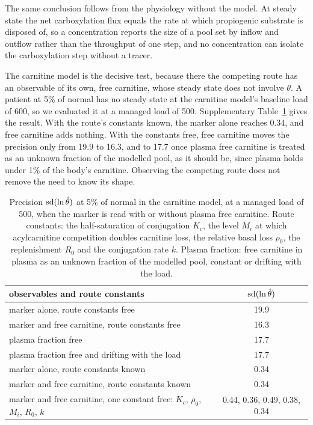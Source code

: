 The same conclusion follows from the physiology without the model. At steady state the net
carboxylation flux equals the rate at which propiogenic substrate is disposed of, so a
concentration reports the size of a pool set by inflow and outflow rather than the throughput
of one step, and no concentration can isolate the carboxylation step without a tracer.

The carnitine model is the decisive test, because there the competing route has an observable
of its own, free carnitine, whose steady state does not involve $\theta$. A patient at 5\% of
normal has no steady state at the carnitine model's baseline load of 600\um, so we evaluated it
at a managed load of 500\um. Supplementary Table~\ref{stab:s4carn} gives the result. With the
route's constants known, the marker alone reaches 0.34, and free carnitine adds nothing. With the
constants free, free carnitine moves the precision only from 19.9 to 16.3, and to 17.7 once plasma
free carnitine is treated as an unknown fraction of the modelled pool, as it should be, since
plasma holds under 1\% of the body's carnitine. Observing the competing route does not remove
the need to know its shape.

\begin{table}[htbp]
\centering\small
\caption{\label{stab:s4carn}Precision $\operatorname{sd}(\ln \hat\theta)$ at 5\% of normal in the carnitine model,
at a managed load of 500\um, when the marker is read with or without plasma free carnitine. Route
constants: the half-saturation of conjugation $K_c$, the level $M_i$ at which acylcarnitine
competition doubles carnitine loss, the relative basal loss $\rho_0$, the replenishment $R_0$
and the conjugation rate $k$. Plasma fraction: free carnitine in plasma as an unknown fraction
of the modelled pool, constant or drifting with the load.}
\begin{tabular}{@{}lc@{}}
\toprule
observables and route constants & $\operatorname{sd}(\ln \hat\theta)$ \\
\midrule
marker alone, route constants free & 19.9 \\
marker and free carnitine, route constants free & 16.3 \\
\quad plasma fraction free & 17.7 \\
\quad plasma fraction free and drifting with the load & 17.7 \\
marker alone, route constants known & 0.34 \\
marker and free carnitine, route constants known & 0.34 \\
marker and free carnitine, one constant free: $K_c$, $\rho_0$, $M_i$, $R_0$, $k$ & 0.44, 0.36, 0.49, 0.38, 0.34 \\
\bottomrule
\end{tabular}
\end{table}

